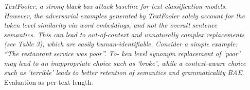 \documentclass[%
	BCOR=8mm, %
	DIV=12, 
	toc=bibliography, %
	toc=listof, %
	oneside, %
	egregdoesnotlikesansseriftitles, %
	]{scrbook}
\begin{document}
\textit{TextFooler, a strong black-box attack baseline for text classification models. However, the adversarial examples generated by TextFooler solely account for the token level similarity via word embeddings, and not the overall sentence semantics. This can lead to out-of-context and unnaturally complex replacements (see Table 3), which are easily human-identifiable. Consider a simple example: “The restaurant service was poor”. To- ken level synonym replacement of ‘poor’ may lead to an inappropriate choice such as ‘broke’, while a context-aware choice such as ‘terrible’ leads to better retention of semantics and grammaticality BAE}.
Evaluation as per text length. 

\begin{table}
\hspace*{-3.1em}
\end{table}
\end{document}

